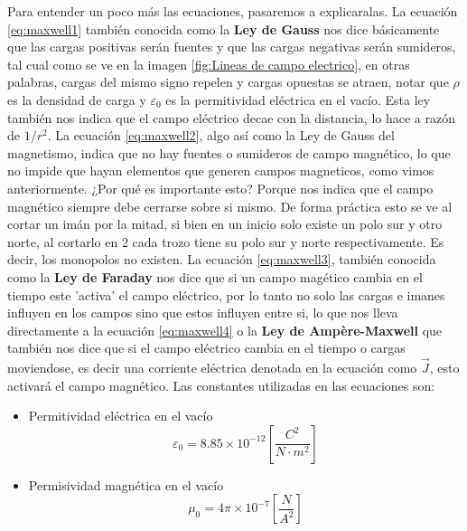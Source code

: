 \documentclass[11pt]{article}
\begin{document}
Para entender un poco más las ecuaciones, pasaremos a explicaralas. La ecuación \eqref{eq:maxwell1} también conocida como la \textbf{Ley de Gauss} nos dice básicamente que las cargas positivas serán fuentes y que las cargas negativas serán sumideros, tal cual como se ve en la imagen \ref{fig:Lineas de campo electrico}, en otras palabras, cargas del mismo signo repelen y cargas opuestas se atraen, notar que $\rho$ es la densidad de carga y $\varepsilon_0$ es la permitividad eléctrica en el vacío. Esta ley también nos indica que el campo eléctrico decae con la distancia, lo hace a razón de $1/r^2$. La ecuación \eqref{eq:maxwell2}, algo así como la Ley de Gauss del magnetismo, indica que no hay fuentes o sumideros de campo magnético, lo que no impide que hayan elementos que generen campos magneticos, como vimos anteriormente. ¿Por qué es importante esto? Porque nos indica que el campo magnético siempre debe cerrarse sobre si mismo. De forma práctica esto se ve al cortar un imán por la mitad, si bien en un inicio solo existe un polo sur y otro norte, al cortarlo en 2 cada trozo tiene su polo sur y norte respectivamente. Es decir, los monopolos no existen. La ecuación \eqref{eq:maxwell3}, también conocida como la \textbf{Ley de Faraday}  nos dice que si un campo magético cambia en el tiempo este 'activa' el campo eléctrico, por lo tanto no solo las cargas e imanes influyen en los campos sino que estos influyen entre si, lo que nos lleva directamente a la ecuación \eqref{eq:maxwell4} o la \textbf{Ley de Ampère-Maxwell} que también nos dice que si el campo eléctrico cambia en el tiempo o cargas moviendose, es decir una corriente eléctrica denotada en la ecuación como $\vec{J}$, esto activará el campo magnético. Las constantes utilizadas en las ecuaciones son:
\begin{itemize}
\item Permitividad eléctrica en el vacío
$$\varepsilon_0=8.85\times 10^{-12} \left[\frac{C^2}{N\cdot m^2}\right]$$
\item Permisividad magnética en el vacío
$$\mu_0=4 \pi \times 10^{-7}\left[\frac{N}{A^2}\right]$$
\end{itemize}
\end{document}
